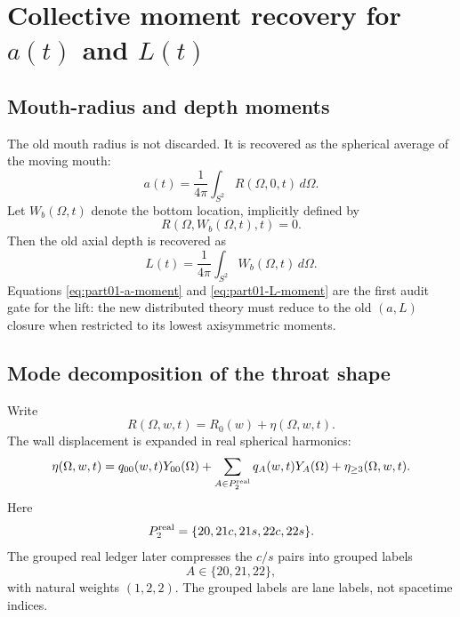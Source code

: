 \section{Collective moment recovery for \texorpdfstring{\(a(t)\)}{a(t)} and \texorpdfstring{\(L(t)\)}{L(t)}}
\label{sec:part01_parent_geometry:collective-moment-recovery-for-a-t-and-l-t}

\subsection{Mouth-radius and depth moments}
\label{subsec:part01-collective-moments}

The old mouth radius is not discarded.  It is recovered as the spherical average of the moving mouth:
\begin{equation}
\label{eq:part01-a-moment}
\boxed{
a(t)=\frac{1}{4\pi}\int_{S^2}R(\Omega,0,t)\,d\Omega}.
\end{equation}
Let \(W_b(\Omega,t)\) denote the bottom location, implicitly defined by
\begin{equation}
R(\Omega,W_b(\Omega,t),t)=0.
\end{equation}
Then the old axial depth is recovered as
\begin{equation}
\label{eq:part01-L-moment}
\boxed{
L(t)=\frac{1}{4\pi}\int_{S^2}W_b(\Omega,t)\,d\Omega}.
\end{equation}
Equations \eqref{eq:part01-a-moment} and \eqref{eq:part01-L-moment} are the first audit gate for the lift: the new distributed theory must reduce to the old \((a,L)\) closure when restricted to its lowest axisymmetric moments.

\subsection{Mode decomposition of the throat shape}
\label{subsec:part01-mode-decomposition}

Write
\begin{equation}
\label{eq:part01-R-eta}
R(\Omega,w,t)=R_0(w)+\eta(\Omega,w,t).
\end{equation}
The wall displacement is expanded in real spherical harmonics:
\begin{equation}
\label{eq:part01-eta-decomposition}
\eta(\Omega,w,t)
=
q_{00}(w,t)Y_{00}(\Omega)
+
\sum_{A\in P_2^{\rm real}}q_A(w,t)Y_A(\Omega)
+
\eta_{\ge3}(\Omega,w,t).
\end{equation}
Here
\begin{equation}
P_2^{\rm real}=\{20,21c,21s,22c,22s\}.
\end{equation}
The grouped real ledger later compresses the \(c/s\) pairs into grouped labels
\begin{equation}
A\in\{20,21,22\},
\end{equation}
with natural weights \((1,2,2)\).  The grouped labels are lane labels, not spacetime indices.

